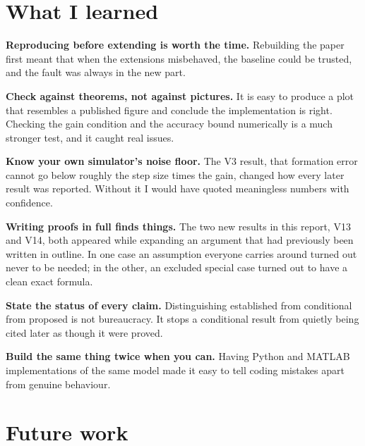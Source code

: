 \documentclass[11pt,a4paper]{article}
\begin{document}
\section{What I learned}

\textbf{Reproducing before extending is worth the time.} Rebuilding the paper first meant that when
the extensions misbehaved, the baseline could be trusted, and the fault was always in the new part.

\textbf{Check against theorems, not against pictures.} It is easy to produce a plot that resembles a
published figure and conclude the implementation is right. Checking the gain condition and the
accuracy bound numerically is a much stronger test, and it caught real issues.

\textbf{Know your own simulator's noise floor.} The V3 result, that formation error cannot go below
roughly the step size times the gain, changed how every later result was reported. Without it I would
have quoted meaningless numbers with confidence.

\textbf{Writing proofs in full finds things.} The two new results in this report, V13 and V14, both
appeared while expanding an argument that had previously been written in outline. In one case an
assumption everyone carries around turned out never to be needed; in the other, an excluded special
case turned out to have a clean exact formula.

\textbf{State the status of every claim.} Distinguishing established from conditional from proposed
is not bureaucracy. It stops a conditional result from quietly being cited later as though it were
proved.

\textbf{Build the same thing twice when you can.} Having Python and MATLAB implementations of the
same model made it easy to tell coding mistakes apart from genuine behaviour.

\section{Future work}
\label{sec:future}
\end{document}
